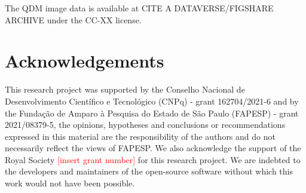 The QDM image data is available at CITE A DATAVERSE/FIGSHARE ARCHIVE under the
CC-XX license.


\section{Acknowledgements}
This research project was supported by the Conselho Nacional de Desenvolvimento Científico e Tecnológico (CNPq) - grant 162704/2021-6 and by the Fundação de Amparo à Pesquisa do Estado de São Paulo (FAPESP) - grant 2021/08379-5, the opinions, hypotheses and conclusions or recommendations expressed in this material are the responsibility of the authors and do not necessarily reflect the views of FAPESP. We also acknowledge the support of the Royal Society \textcolor{red}{[insert grant number]} for this research project. We are indebted to the developers and maintainers of the open-source software without which this work would not have been possible.
